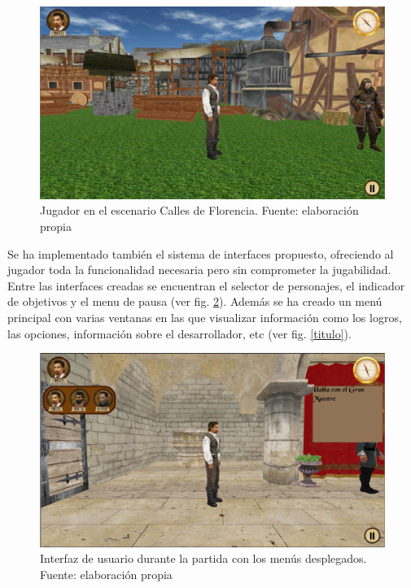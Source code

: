 \begin{figure}
\begin{center}
\includegraphics[scale=0.5]{imagenes/escenarios.png}
\caption{Jugador en el escenario Calles de Florencia.  Fuente: elaboración propia}
\label{escenarios}
\end{center}
\end{figure}

Se ha implementado también el sistema de interfaces propuesto, ofreciendo al jugador  toda la funcionalidad necesaria pero sin comprometer la jugabilidad. Entre las interfaces creadas se encuentran  el selector de personajes, el indicador de objetivos y el menu de pausa (ver fig. \ref{iu}). Además se ha creado un menú principal con varias ventanas en las que visualizar información como los logros, las opciones, información sobre el desarrollador, etc (ver fig. \ref{titulo}).

\begin{figure}
\begin{center}
\includegraphics[scale=0.5]{imagenes/iu.png}
\caption{Interfaz de usuario durante la partida con los menús desplegados.  Fuente: elaboración propia}
\label{iu}
\end{center}
\end{figure}

